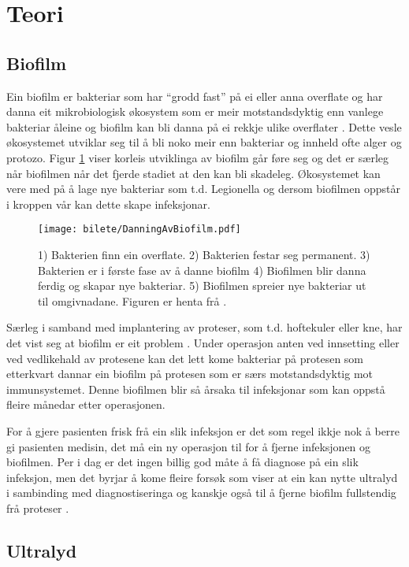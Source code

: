 \section{Teori}
\subsection{Biofilm}
Ein biofilm er bakteriar som har ``grodd fast'' på ei eller anna overflate og har danna eit mikrobiologisk økosystem som er meir motstandsdyktig enn vanlege bakteriar åleine og biofilm kan bli danna på ei rekkje ulike overflater \cite{biofilm}\cite{biofilm2}. Dette vesle økosystemet utviklar seg til å bli noko meir enn bakteriar og innheld ofte alger og protozo. Figur \ref{fig:biofilm} viser korleis utviklinga av biofilm går føre seg og det er særleg når biofilmen når det fjerde stadiet at den kan bli skadeleg. Økosystemet kan vere med på å lage nye bakteriar som t.d. Legionella \cite{biofilm} og dersom biofilmen oppstår i kroppen vår kan dette skape infeksjonar.

\begin{figure}[htbp]
  \texttt{[image: bilete/DanningAvBiofilm.pdf]}
  \caption[Dei fem fasene i biofilmdanning]{1) Bakterien finn ein overflate. 2) Bakterien festar seg permanent. 3) Bakterien er i første fase av å danne biofilm 4) Biofilmen blir danna ferdig og skapar nye bakteriar. 5) Biofilmen spreier nye bakteriar ut til omgivnadane. Figuren er henta frå \cite{biofilmfigur}.}
  \label{fig:biofilm}
\end{figure}

Særleg i samband med implantering av proteser, som t.d. hoftekuler eller kne, har det vist seg at biofilm er eit problem \cite{ultraprotese}. Under operasjon anten ved innsetting eller ved vedlikehald av protesene kan det lett kome bakteriar på protesen som etterkvart dannar ein biofilm på protesen som er særs motstandsdyktig mot immunsystemet. Denne biofilmen blir så årsaka til infeksjonar som kan oppstå fleire månedar etter operasjonen. 

For å gjere pasienten frisk frå ein slik infeksjon er det som regel ikkje nok å berre gi pasienten medisin, det må ein ny operasjon til for å fjerne infeksjonen og biofilmen\cite{infection}. Per i dag er det ingen billig god måte å få diagnose på ein slik infeksjon, men det byrjar å kome fleire forsøk som viser at ein kan nytte ultralyd i sambinding med diagnostiseringa og kanskje også til å fjerne biofilm fullstendig frå proteser \cite{ultraprotese}.

\subsection{Ultralyd}
